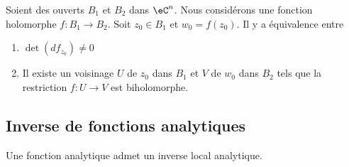 \begin{theorem}       \label{THOooNBGZooHuGtxW}
    Soient des ouverts \( B_1\) et \( B_2\) dans \( \eC^n\). Nous considérons une fonction holomorphe \( f\colon B_1\to B_2\). Soit \( z_0\in B_1\) et \( w_0=f(z_0)\). Il y a équivalence entre
    \begin{enumerate}
        \item
            \( \det(df_{z_0})\neq 0\)
        \item
            Il existe un voisinage \( U\) de \( z_0\) dans \( B_1\) et \( V\) de \( w_0\) dans \( B_2\) tels que la restriction \( f\colon U\to V\) est biholomorphe.
    \end{enumerate}
\end{theorem}

\subsection{Inverse de fonctions analytiques}

\begin{theorem}     \label{THOooXWCSooLSPzhO}
    Une fonction analytique admet un inverse local analytique.   
\end{theorem}
